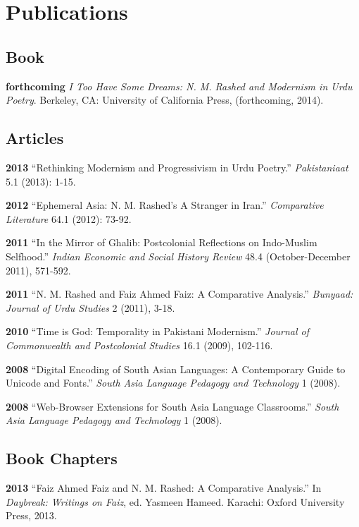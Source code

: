 \documentclass[letterpaper,12pt]{article}
\begin{document}
\section{Publications%
  \label{publications}%
}


\subsection{Book%
  \label{book}%
}

\textbf{forthcoming}
\emph{I Too Have Some Dreams: N. M. Rashed and Modernism in Urdu Poetry}.
Berkeley, CA: University of California Press, (forthcoming, 2014).


\subsection{Articles%
  \label{articles}%
}

\textbf{2013}
“Rethinking Modernism and Progressivism in Urdu Poetry.”
\emph{Pakistaniaat} 5.1 (2013): 1-15.

\textbf{2012}
“Ephemeral Asia: N. M. Rashed’s A Stranger in Iran.”
\emph{Comparative Literature} 64.1 (2012): 73-92.

\textbf{2011}
“In the Mirror of Ghalib: Postcolonial Reflections on Indo-Muslim Selfhood.”
\emph{Indian Economic and Social History Review} 48.4 (October-December 2011), 571-592.

\textbf{2011}
“N. M. Rashed and Faiz Ahmed Faiz: A Comparative Analysis.”
\emph{Bunyaad: Journal of Urdu Studies}  2 (2011), 3-18.

\textbf{2010}
“Time is God: Temporality in Pakistani Modernism.”
\emph{Journal of Commonwealth and Postcolonial Studies} 16.1 (2009), 102-116.

\textbf{2008}
“Digital Encoding of South Asian Languages: A Contemporary Guide to Unicode and Fonts.”
\emph{South Asia Language Pedagogy and Technology} 1 (2008).

\textbf{2008}
“Web-Browser Extensions for South Asia Language Classrooms.”
\emph{South Asia Language Pedagogy and Technology} 1 (2008).


\subsection{Book Chapters%
  \label{book-chapters}%
}

\textbf{2013}
“Faiz Ahmed Faiz and N. M. Rashed: A Comparative Analysis.”
In \emph{Daybreak: Writings on Faiz},
ed. Yasmeen Hameed.
Karachi: Oxford University Press, 2013.
\end{document}
